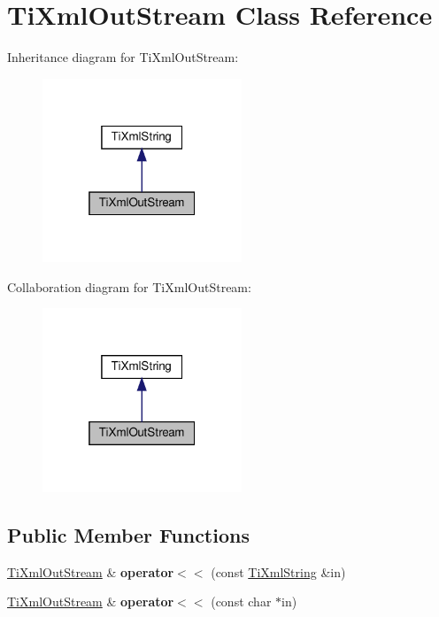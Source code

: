 \hypertarget{classTiXmlOutStream}{}\section{Ti\+Xml\+Out\+Stream Class Reference}
\label{classTiXmlOutStream}


Inheritance diagram for Ti\+Xml\+Out\+Stream\+:
\nopagebreak
\begin{figure}[H]
\begin{center}
\leavevmode
\includegraphics[width=169pt]{classTiXmlOutStream__inherit__graph}
\end{center}
\end{figure}


Collaboration diagram for Ti\+Xml\+Out\+Stream\+:
\nopagebreak
\begin{figure}[H]
\begin{center}
\leavevmode
\includegraphics[width=169pt]{classTiXmlOutStream__coll__graph}
\end{center}
\end{figure}
\subsection*{Public Member Functions}
\begin{DoxyCompactItemize}
\item 
\mbox{\label{classTiXmlOutStream_a3640dcb1c0903be3bc6966cdc9a79db6}} 
\hyperlink{classTiXmlOutStream}{Ti\+Xml\+Out\+Stream} \& {\bfseries operator$<$$<$} (const \hyperlink{classTiXmlString}{Ti\+Xml\+String} \&in)
\item 
\mbox{\label{classTiXmlOutStream_af2117e5a8cbfcb69544804ad2859bfb6}} 
\hyperlink{classTiXmlOutStream}{Ti\+Xml\+Out\+Stream} \& {\bfseries operator$<$$<$} (const char $\ast$in)
\end{DoxyCompactItemize}
